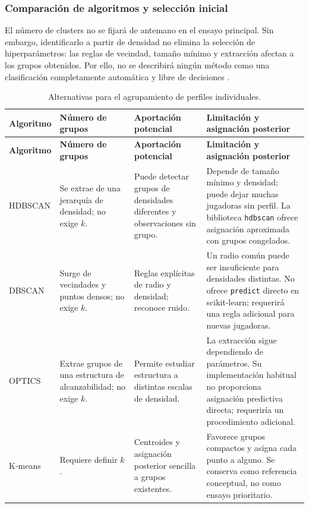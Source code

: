 \subsubsection*{Comparación de algoritmos y selección inicial}
El número de clusters no se fijará de antemano en el ensayo principal. Sin embargo, identificarlo a partir de densidad no elimina la selección de hiperparámetros: las reglas de vecindad, tamaño mínimo y extracción afectan a los grupos obtenidos. Por ello, no se describirá ningún método como una clasificación completamente automática y libre de decisiones \cite{hdbscanParametrosPerfiles}.

\begingroup
\small
{}
\setlength{\tabcolsep}{3pt}
\begin{longtable}{@{}>{\raggedright\arraybackslash}p{2.2cm}>{\raggedright\arraybackslash}p{2.6cm}>{\raggedright\arraybackslash}p{4.5cm}>{\raggedright\arraybackslash}p{5.3cm}@{}}
\caption{Alternativas para el agrupamiento de perfiles individuales.}\label{tab:algoritmos-clustering-perfiles}\\
\toprule\textbf{Algoritmo}&\textbf{Número de grupos}&\textbf{Aportación potencial}&\textbf{Limitación y asignación posterior}\\\midrule\endfirsthead
\toprule\textbf{Algoritmo}&\textbf{Número de grupos}&\textbf{Aportación potencial}&\textbf{Limitación y asignación posterior}\\\midrule\endhead
\bottomrule\endlastfoot
HDBSCAN&Se extrae de una jerarquía de densidad; no exige $k$.&Puede detectar grupos de densidades diferentes y observaciones sin grupo.&Depende de tamaño mínimo y densidad; puede dejar muchas jugadoras sin perfil. La biblioteca \texttt{hdbscan} ofrece asignación aproximada con grupos congelados.\\
DBSCAN&Surge de vecindades y puntos densos; no exige $k$.&Reglas explícitas de radio y densidad; reconoce ruido.&Un radio común puede ser insuficiente para densidades distintas. No ofrece \texttt{predict} directo en scikit-learn; requerirá una regla adicional para nuevas jugadoras.\\
OPTICS&Extrae grupos de una estructura de alcanzabilidad; no exige $k$.&Permite estudiar estructura a distintas escalas de densidad.&La extracción sigue dependiendo de parámetros. Su implementación habitual no proporciona asignación predictiva directa; requeriría un procedimiento adicional.\\
K-means&Requiere definir $k$.&Centroides y asignación posterior sencilla a grupos existentes.&Favorece grupos compactos y asigna cada punto a alguno. Se conserva como referencia conceptual, no como ensayo prioritario.\\
\end{longtable}
\endgroup

